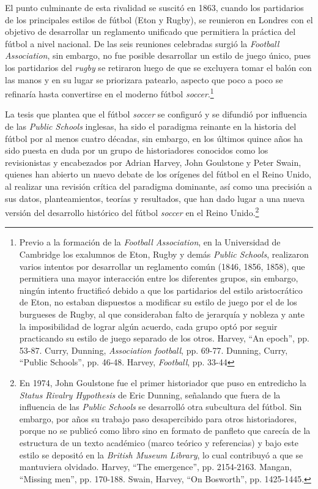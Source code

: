 \documentclass[11pt,a5paper,twoside]{book} %
\begin{document}
El punto culminante de esta rivalidad se suscitó en 1863, cuando los partidarios de
los principales estilos de fútbol (Eton y Rugby), se reunieron en Londres con el objetivo de
desarrollar un reglamento unificado que permitiera la práctica del fútbol a nivel nacional. De
las seis reuniones celebradas surgió la \emph{Football Association}, sin embargo, no fue posible
desarrollar un estilo de juego único, pues los partidarios del \emph{rugby} se retiraron luego de que
se excluyera tomar el balón con las manos y en su lugar se priorizara patearlo, aspecto que
poco a poco se refinaría hasta convertirse en el moderno fútbol \emph{soccer}.\footnote{Previo a la formación de la \emph{Football Association}, en la Universidad de Cambridge los exalumnos de Eton, Rugby y demás \emph{Public Schools}, realizaron varios intentos por desarrollar un reglamento común (1846, 1856, 1858), que permitiera una mayor interacción entre los diferentes grupos, sin embargo, ningún intento fructificó debido a que los partidarios del estilo aristocrático de Eton, no estaban dispuestos a modificar su estilo de juego por el de los burgueses de Rugby, al que consideraban falto de jerarquía y nobleza y ante la imposibilidad de lograr algún acuerdo, cada grupo optó por seguir practicando su estilo de juego separado de los otros. Harvey, ``An epoch'', pp. 53-87. Curry, Dunning, \emph{Association football}, pp. 69-77. Dunning, Curry, ``Public Schools'', pp. 46-48. Harvey, \emph{Football}, pp. 33-44}

La tesis que plantea que el fútbol \emph{soccer} se configuró y se difundió por influencia de
las \emph{Public Schools} inglesas, ha sido el paradigma reinante en la historia del fútbol por al
menos cuatro décadas, sin embargo, en los últimos quince años ha sido puesta en duda por
un grupo de historiadores conocidos como los revisionistas y encabezados por Adrian
Harvey, John Goulstone y Peter Swain, quienes han abierto un nuevo debate de los orígenes
del fútbol en el Reino Unido, al realizar una revisión crítica del paradigma dominante, así como una precisión a sus datos, planteamientos, teorías y resultados, que han dado lugar a
una nueva versión del desarrollo histórico del fútbol \emph{soccer} en el Reino Unido.\footnote{En 1974, John Goulstone fue el primer historiador que puso en entredicho la \emph{Status Rivalry Hypothesis} de Eric Dunning, señalando que fuera de la influencia de las \emph{Public Schools} se desarrolló otra subcultura del fútbol. Sin embargo, por años su trabajo paso desapercibido para otros historiadores, porque no se publicó como libro sino en formato de panfleto que carecía de la estructura de un texto académico (marco teórico y referencias) y bajo este estilo se depositó en la \emph{British Museum Library}, lo cual contribuyó a que se mantuviera olvidado. Harvey, ``The emergence'', pp. 2154-2163. Mangan, ``Missing men'', pp. 170-188. Swain, Harvey, ``On Bosworth'', pp. 1425-1445.}
\end{document}
